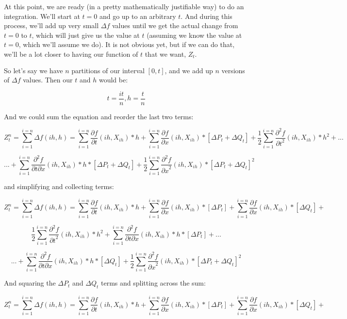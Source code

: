 \documentclass{article}
\begin{document}
At this point, we are ready (in a pretty mathematically justifiable way) to do an integration. We'll start at $t=0$ and go up to an arbitrary $t$.  And during this process, we'll add up very small $\Delta f$ values until we get the actual change from $t=0$ to $t$, which will just give us the value at $t$ (assuming we know the value at $t=0$, which we'll assume we do).  It is not obvious yet, but if we can do that, we'll be a lot closer to having our function of $t$ that we want, $Z_t$. 

So let's say we have $n$ partitions of our interval $[0,t]$, and we add up $n$ versions of $\Delta f$ values.  Then our $t$ and $h$ would be:

$$t = \frac{it}{n}, h = \frac{t}{n}$$

And we could sum the equation and reorder the last two terms:

$$Z_t^n = \sum_{i=1}^{i = n} \Delta f\left(ih,h\right) = \sum_{i=1}^{i = n} \frac{\partial f}{\partial t}(ih,X_{ih}) *h + \sum_{i=1}^{i = n}\frac{\partial f}{\partial x}(ih,X_{ih}) *[\Delta P_t+ \Delta Q_t] +  \frac{1}{2}\sum_{i=1}^{i = n}\frac{\partial^2 f}{{\partial t}^2}(ih,X_{ih}) * {h}^2 + ... $$


$$...   + \sum_{i=1}^{i = n} \frac{\partial^2 f}{\partial t \partial x}(ih,X_{ih}) *h*[\Delta P_t+ \Delta Q_t] + \frac{1}{2}\sum_{i=1}^{i = n}\frac{\partial^2 f}{{\partial x}^2}(ih,X_{ih}) * {[\Delta P_t+ \Delta Q_t]}^2$$

and simplifying and collecting terms:


$$Z_t^n = \sum_{i=1}^{i = n} \Delta f\left(ih,h\right) = \sum_{i=1}^{i = n} \frac{\partial f}{\partial t}(ih,X_{ih}) *h + \sum_{i=1}^{i = n}\frac{\partial f}{\partial x}(ih,X_{ih}) *[\Delta P_t] + \sum_{i=1}^{i = n}\frac{\partial f}{\partial x}(ih,X_{ih}) *[\Delta Q_t] +  $$


$$ \frac{1}{2}\sum_{i=1}^{i = n}\frac{\partial^2 f}{{\partial t}^2}(ih,X_{ih}) * {h}^2 + \sum_{i=1}^{i = n} \frac{\partial^2 f}{\partial t \partial x}(ih,X_{ih}) *h*[\Delta P_t] + ... $$



$$...   + \sum_{i=1}^{i = n} \frac{\partial^2 f}{\partial t \partial x}(ih,X_{ih}) *h*[ \Delta Q_t]+ \frac{1}{2}\sum_{i=1}^{i = n}\frac{\partial^2 f}{{\partial x}^2}(ih,X_{ih}) * {[\Delta P_t+ \Delta Q_t]}^2$$

And squaring the $\Delta P_t$ and $\Delta Q_t$ terms and splitting across the sum:



$$Z_t^n = \sum_{i=1}^{i = n} \Delta f\left(ih,h\right) = \sum_{i=1}^{i = n} \frac{\partial f}{\partial t}(ih,X_{ih}) *h + \sum_{i=1}^{i = n}\frac{\partial f}{\partial x}(ih,X_{ih}) *[\Delta P_t] + \sum_{i=1}^{i = n}\frac{\partial f}{\partial x}(ih,X_{ih}) *[\Delta Q_t] +  $$
\end{document}
